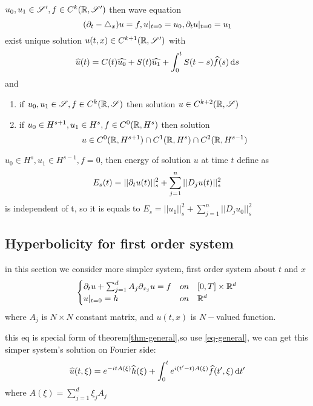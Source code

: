 \documentclass[../main]{subfiles}
\begin{document}
\begin{thm}
    $u_0,u_1\in \mathscr{S}', f\in C^k(\mathbb{R},\mathscr{S}')$ then wave equation \begin{equation}
        (\partial_t-\triangle_x)u=f,u|_{t=0}=u_0,\partial_t u|_{t=0}=u_1
    \end{equation}exist unique solution $u(t,x)\in C^{k+1}(\mathbb{R},\mathscr{S}')$
    with \begin{equation}
        \widehat{u}(t)=C(t)\widehat{u_0}+S(t)\widehat{u_1}+\int_0^t S(t-s)\widehat{f}(s)\,\mathrm{d}s
    \end{equation} and 
    \begin{enumerate}
        \item if $u_0,u_1\in \mathscr{S},f\in C^k(\mathbb{R},\mathscr{S})$ then solution $u\in C^{k+2}(\mathbb{R},\mathscr{S})$
        \item if $u_0\in H^{s+1},u_1\in H^s,f\in C^0(\mathbb{R},H^s)$ then solution \begin{equation}
            u\in C^0(\mathbb{R},H^{s+1})\cap C^1(\mathbb{R},H^s)\cap C^2(\mathbb{R},H^{s-1})
        \end{equation}
    \end{enumerate}
\end{thm}
\newpage

\begin{thm}
    $u_0\in H^s,u_1\in H^{s-1},f=0$, then energy of solution $u$ at time $t$ define as \begin{equation}
        E_s(t)=||\partial_t u(t)||_s^2+\sum_{j=1}^n||D_j u(t)||_s^2
    \end{equation} is independent of t, so it is equals to $E_s=||u_1||_s^2+\sum_{j=1}^n||D_j u_0||_s^2$
\end{thm}

\newpage

\subsection{Hyperbolicity for first order system}
in this section we consider more simpler system, first order system about $t$ and $x$
\begin{align}
    \begin{cases}
        \partial_t u +\sum_{j=1}^d A_j\partial_{x_j}u=f  &on \quad [0,T]\times \mathbb{R}^d\\
        u|_{t=0}=h  &on \quad \mathbb{R}^d
    \end{cases}
\end{align}
where $A_j$ is $N\times N$ constant matrix, and $u(t,x)$ is $N-$valued function.

this eq is special form of theorem\ref{thm-general},so use \eqref{eq-general}, we can get this simper system's solution on Fourier side:
\begin{equation}
    \widehat{u}(t,\xi)=e^{-it A(\xi)}\widehat{h}(\xi)+\int_0^t e^{i(t'-t)A(\xi)}\widehat{f}(t',\xi)\,\mathrm{d}t'
\end{equation}
where $A(\xi)=\sum_{j=1}^d\xi_j A_j$
\end{document}
